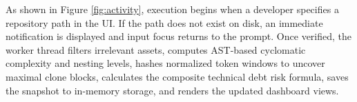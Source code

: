 As shown in Figure \ref{fig:activity}, execution begins when a developer specifies a repository path in the UI. If the path does not exist on disk, an immediate notification is displayed and input focus returns to the prompt. Once verified, the worker thread filters irrelevant assets, computes AST-based cyclomatic complexity and nesting levels, hashes normalized token windows to uncover maximal clone blocks, calculates the composite technical debt risk formula, saves the snapshot to in-memory storage, and renders the updated dashboard views.

